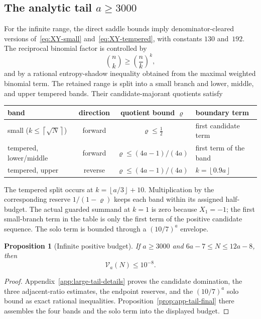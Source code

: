 \documentclass[11pt]{article}
\newtheorem{proposition}[theorem]{Proposition}
\theoremstyle{definition}
\theoremstyle{remark}
\newcommand{\floor}[1]{\left\lfloor #1\right\rfloor}
\newcommand{\ceil}[1]{\left\lceil #1\right\rceil}
\begin{document}
\subsection{The analytic tail \texorpdfstring{$a\ge3000$}{a>=3000}}

For the infinite range, the direct saddle bounds imply denominator-cleared
versions of~\eqref{eq:XY-small} and~\eqref{eq:XY-tempered}, with constants
$130$ and~$192$.  The reciprocal binomial factor is controlled by
\begin{equation}\label{eq:choose-power}
  \binom nk\ge\left(\frac nk\right)^k,
\end{equation}
and by a rational entropy-shadow inequality obtained from the maximal weighted
binomial term.  The retained range is split into a small branch and lower,
middle, and upper tempered bands.  Their candidate-majorant quotients satisfy
\begin{center}
\begin{tabular}{lccl}
\toprule
band & direction & quotient bound $\varrho$ & boundary term\\
\midrule
small ($k\le\ceil{\sqrt N}$) & forward & $\varrho\le\tfrac12$
  & first candidate term\\
tempered, lower/middle & forward & $\varrho\le(4a-1)/(4a)$
  & first term of the band\\
tempered, upper & reverse & $\varrho\le(4a-1)/(4a)$
  & $k=\floor{0.9a}$\\
\bottomrule
\end{tabular}
\end{center}
The tempered split occurs at $k=\floor{a/3}+10$.  Multiplication by the
corresponding reserve $1/(1-\varrho)$ keeps each band within its assigned
half-budget.  The actual guarded summand at $k=1$ is zero because $X_1=-1$;
the first small-branch term in the table is only the first term of the positive
candidate sequence.  The solo term is bounded through a $(10/7)^a$ envelope.

\begin{proposition}[Infinite positive budget]\label{prop:tail-positive-budget}
If $a\ge3000$ and $6a-7\le N\le12a-8$, then
\[
  \mathcal V_a(N)\le10^{-8}.
\]
\end{proposition}

\begin{proof}
Appendix~\ref{app:large-tail-details} proves the candidate domination, the
three adjacent-ratio estimates, the endpoint reserves, and the $(10/7)^a$ solo
bound as exact rational inequalities.  Proposition~\ref{prop:app-tail-final}
there assembles the four bands and the solo term into the displayed budget.
\end{proof}
\end{document}
